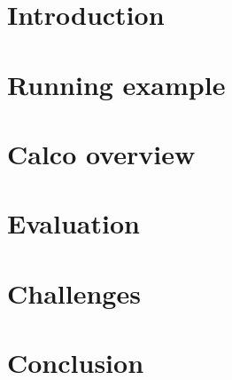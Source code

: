 \documentclass[sigconf]{acmart}
\theoremstyle{remark}
\begin{document}



\maketitle

\thispagestyle{empty}

\section{Introduction}


\section{Running example}


\section{Calco overview}


\section{Evaluation}


\section{Challenges}


\section{Conclusion}




\end{document}
